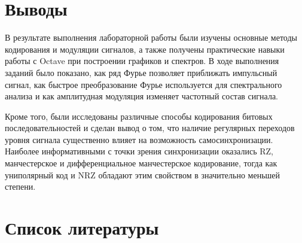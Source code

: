 \documentclass[
  english,
  russian,
  12pt,
  a4paper,
  DIV=11,
  numbers=noendperiod]{scrreprt}
\begin{document}
\chapter{Выводы}\label{ux432ux44bux432ux43eux434ux44b}

В результате выполнения лабораторной работы были изучены основные методы
кодирования и модуляции сигналов, а также получены практические навыки
работы с Octave при построении графиков и спектров. В ходе выполнения
заданий было показано, как ряд Фурье позволяет приближать импульсный
сигнал, как быстрое преобразование Фурье используется для спектрального
анализа и как амплитудная модуляция изменяет частотный состав сигнала.

Кроме того, были исследованы различные способы кодирования битовых
последовательностей и сделан вывод о том, что наличие регулярных
переходов уровня сигнала существенно влияет на возможность
самосинхронизации. Наиболее информативными с точки зрения синхронизации
оказались RZ, манчестерское и дифференциальное манчестерское
кодирование, тогда как униполярный код и NRZ обладают этим свойством в
значительно меньшей степени.

\chapter*{Список
литературы}\label{ux441ux43fux438ux441ux43eux43a-ux43bux438ux442ux435ux440ux430ux442ux443ux440ux44b}

\printbibliography[heading=none]
\end{document}
